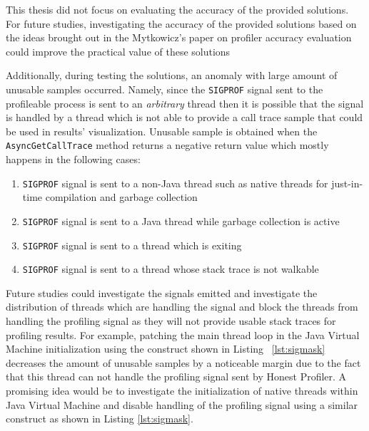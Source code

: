 \documentclass[..thesis.tex]{subfiles}
\begin{document}
This thesis did not focus on evaluating the accuracy of the provided solutions. For future studies, investigating the accuracy of the provided solutions based on the ideas brought out in the Mytkowicz's paper on profiler accuracy evaluation \cite{mytkowicz_evaluating_2010} could improve the practical value of these solutions


Additionally, during testing the solutions, an anomaly with large amount of unusable samples occurred. Namely, since the \texttt{SIGPROF} signal sent to the profileable process is sent to an \textit{arbitrary} thread then it is possible that the signal is handled by a thread which is not able to provide a call trace sample that could be used in results' visualization. Unusable sample is obtained when the \texttt{Async\-Get\-Call\-Trace} method returns a negative return value which mostly happens in the following cases:
\begin{enumerate}
	\item \texttt{SIGPROF} signal is sent to a non-Java thread such as native threads for just-in-time compilation and garbage collection
	\item \texttt{SIGPROF} signal is sent to a Java thread while garbage collection is active
	\item \texttt{SIGPROF} signal is sent to a thread which is exiting
	\item \texttt{SIGPROF} signal is sent to a thread whose stack trace is not walkable
\end{enumerate}

Future studies could investigate the signals emitted and investigate the distribution of threads which are handling the signal and block the threads from handling the profiling signal as they will not provide usable stack traces for profiling results.
For example, patching the main thread loop in the Java Virtual Machine initialization using the construct shown in Listing ~\ref{lst:sigmask} decreases the amount of unusable samples by a noticeable margin due to the fact that this thread can not handle the profiling signal sent by Honest Profiler. A promising idea would be to investigate the initialization of native threads within Java Virtual Machine and disable handling of the profiling signal using a similar construct as shown in Listing \ref{lst:sigmask}.
\end{document}
